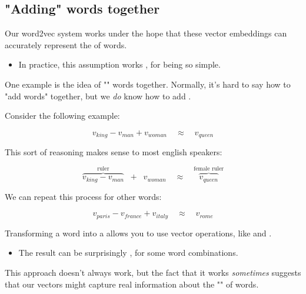     

    \pagebreak
    
    \subsection{"Adding" words together}

        Our word2vec system works under the hope that these vector embeddings can accurately represent the  of words.

        \begin{itemize}
            \item In practice, this assumption works , for being so simple.
        \end{itemize}

        One example is the idea of "" words together. Normally, it's hard to say how to "add words" together, but we \textit{do} know how to add .

        Consider the following example:

        \begin{equation}
            v_{king} - v_{man} + v_{woman}  \quad\approx\quad v_{queen}
        \end{equation}

        This sort of reasoning makes sense to most english speakers: 

        \begin{equation}
            \overbrace{ v_{king} - v_{man} }^{\text{ruler}} \;\;+\;\; v_{woman} 
            \quad\approx\quad \overbrace{v_{queen}}^{\text{female ruler}}
        \end{equation}

        We can repeat this process for other words:

        \begin{equation}
            v_{paris} - v_{france} + v_{italy}  \quad\approx\quad v_{rome}
        \end{equation}

        \begin{concept}
            Transforming a word into a  allows you to use vector operations, like  and .

            \begin{itemize}
                \item The result can be surprisingly , for some word combinations.
            \end{itemize}

            This approach doesn't always work, but the fact that it works \textit{sometimes} suggests that our vectors might capture real information about the "" of words.
        \end{concept}

